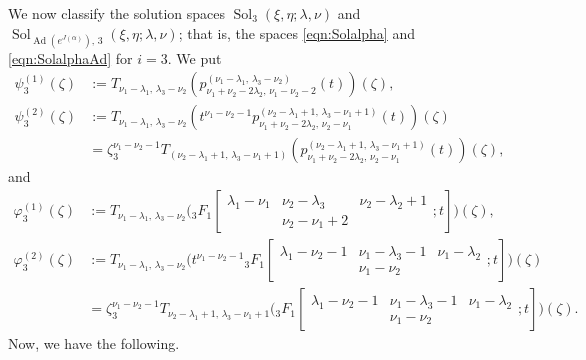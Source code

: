 \documentclass[a4paper,11pt,reqno]{amsart}
\newcommand{\0}{{\bf 0}}
\newcommand{\1}{{\bf 1}}
\DeclareMathOperator{\Ad}{Ad}
\DeclareMathOperator{\Sol}{Sol}
\theoremstyle{plain}
\theoremstyle{definition}
\numberwithin{equation}{section}
\theoremstyle{definition}
\begin{document}
\medskip

We now classify the solution spaces 
$\Sol_3(\xi, \eta; \lambda, \nu)$ and 
$\Sol_{\Ad(e^{J(\alpha)}),\, 3}(\xi,\eta; \lambda,\nu)$; that is, the spaces \eqref{eqn:Solalpha} and \eqref{eqn:SolalphaAd} for $i=3$.
We put
\begin{align*}
\psi_3^{(1)}(\zeta) &:= T_{\nu_1-\lambda_1, \,\lambda_3-\nu_2}
(p^{(\nu_1-\lambda_1, \,\lambda_3-\nu_2)}_{\nu_1+\nu_2-2\lambda_2,\, \nu_1-\nu_2-2}(t))(\zeta),\\[3pt]
\psi_3^{(2)}(\zeta) 
&:= T_{\nu_1-\lambda_1,\, \lambda_3-\nu_2}(t^{\nu_1-\nu_2-1}p^{(\nu_2-\lambda_1+1, \,\lambda_3-\nu_1+1)}_{\nu_1+\nu_2-2\lambda_2, \,\nu_2-\nu_1}(t))(\zeta)\\[3pt]
&= \zeta_3^{\nu_1-\nu_2-1}
T_{(\nu_2-\lambda_1+1,\,\lambda_3-\nu_1+1)}(p^{(\nu_2-\lambda_1+1, \,\lambda_3-\nu_1+1)}_{\nu_1+\nu_2-2\lambda_2, \,\nu_2-\nu_1}(t))(\zeta),
\end{align*}
and
\begin{align*}
\varphi_3^{(1)}(\zeta) &:= T_{\nu_1-\lambda_1,\, \lambda_3-\nu_2}
\Big({}_3F_1\left [\begin{matrix}
\lambda_1 - \nu_1& \nu_2 - \lambda_3 & \nu_2 - \lambda_2 + 1 \\
& \nu_2 - \nu_1 + 2 &  
\end{matrix};t\right ]\Big)(\zeta),\\[3pt]
\varphi_3^{(2)} (\zeta)
&:= T_{\nu_1-\lambda_1, \,\lambda_3-\nu_2}\Big(t^{\nu_1-\nu_2-1}{}_3F_1
\left [\begin{matrix}
\lambda_1 - \nu_2 - 1& \nu_1 - \lambda_3 - 1 & \nu_1 - \lambda_2 \\
& \nu_1 - \nu_2 &  
\end{matrix};t\right ]\Big)(\zeta)\\[3pt]
&=  \zeta_3^{\nu_1-\nu_2-1}
T_{\nu_2-\lambda_1+1,\,\lambda_3-\nu_1+1}
\Big({}_3F_1
\left [\begin{matrix}
\lambda_1 - \nu_2 - 1& \nu_1 - \lambda_3 - 1 & \nu_1 - \lambda_2 \\
& \nu_1 - \nu_2 &  
\end{matrix};t\right ]\Big)(\zeta).
\end{align*}
Now, we have the following.
\end{document}
